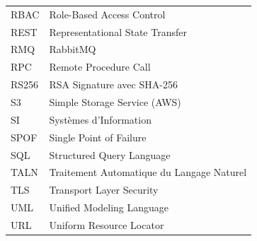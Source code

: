 \begin{longtable}[l]{p{4cm} p{11cm}}
        RBAC & Role-Based Access Control \\
        REST & Representational State Transfer \\
        RMQ & RabbitMQ \\
        RPC & Remote Procedure Call \\
        RS256 & RSA Signature avec SHA-256 \\
        S3 & Simple Storage Service (AWS) \\
        SI & Systèmes d'Information \\
        SPOF & Single Point of Failure \\
        SQL & Structured Query Language \\
        TALN & Traitement Automatique du Langage Naturel \\
        TLS & Transport Layer Security \\
        UML & Unified Modeling Language \\
        URL & Uniform Resource Locator \\
    \end{longtable}
